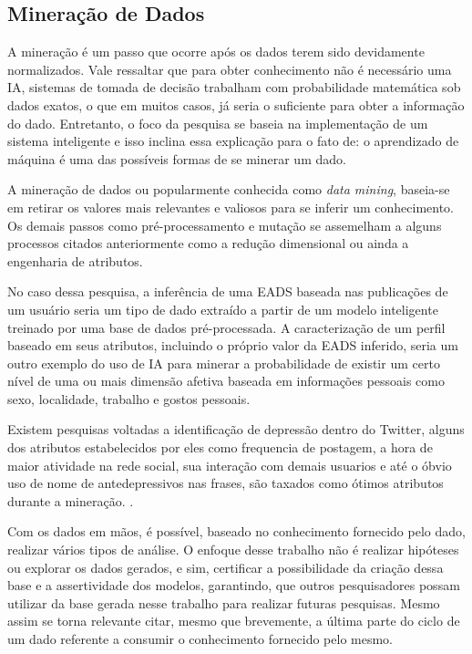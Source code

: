 \subsection{Mineração de Dados}
A mineração é um passo que ocorre após os dados terem sido devidamente normalizados. Vale ressaltar que para obter conhecimento não é necessário uma IA, sistemas de tomada de decisão trabalham com probabilidade matemática sob dados exatos, o que em muitos casos, já seria o suficiente para obter a informação do dado. Entretanto, o foco da pesquisa se baseia na implementação de um sistema inteligente e isso inclina essa explicação para o fato de: o aprendizado de máquina é uma das possíveis formas de se minerar um dado.

A mineração de dados ou popularmente conhecida como \textit{data mining}, baseia-se em retirar os valores mais relevantes e valiosos para se inferir um conhecimento. Os demais passos como pré-processamento e mutação se assemelham a alguns processos citados anteriormente como a redução dimensional ou ainda a engenharia de atributos.

No caso dessa pesquisa, a inferência de uma EADS baseada nas publicações de um usuário seria um tipo de dado extraído a partir de um modelo inteligente treinado por uma base de dados pré-processada. A caracterização de um perfil baseado em seus atributos, incluindo o próprio valor da EADS inferido, seria um outro exemplo do uso de IA para minerar a probabilidade de existir um certo nível de uma ou mais dimensão afetiva baseada em informações pessoais como sexo, localidade, trabalho e gostos pessoais.

Existem pesquisas voltadas a identificação de depressão dentro do Twitter, alguns dos atributos estabelecidos por eles como frequencia de postagem, a hora de maior atividade na rede social, sua interação com demais usuarios e até o óbvio uso de nome de antedepressivos nas frases, são taxados como ótimos atributos durante a mineração. \cite{de2013social, de2013predicting}.

Com os dados em mãos, é possível, baseado no conhecimento fornecido pelo dado, realizar vários tipos de análise. O enfoque desse trabalho não é realizar hipóteses ou explorar os dados gerados, e sim, certificar a possibilidade da criação dessa base e a assertividade dos modelos, garantindo, que outros pesquisadores possam utilizar da base gerada nesse trabalho para realizar futuras pesquisas. Mesmo assim se torna relevante citar, mesmo que brevemente, a última parte do ciclo de um dado referente a consumir o conhecimento fornecido pelo mesmo.
